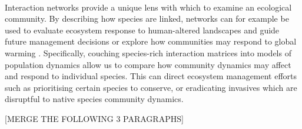 \documentclass[a4,12pt]{article}
\begin{document}
\begin{itemize}



 

    \paragraph{}
    Interaction networks provide a unique lens with which to examine an ecological community. By describing how species are linked, networks can for example be used to evaluate ecosystem response to human-altered landscapes and guide future management decisions \parencite{Ross2011} or explore how communities may respond to global warming \parencite{Gorman2019}. Specifically, couching species-rich interaction matrices into models of population dynamics allow us to compare how community dynamics may affect and respond to individual species. This can direct ecosystem management efforts such as prioritising certain species to conserve, or eradicating invasives which are disruptful to native species community dynamics. 

    [MERGE THE FOLLOWING 3 PARAGRAPHS]


\end{itemize}
\end{document}
